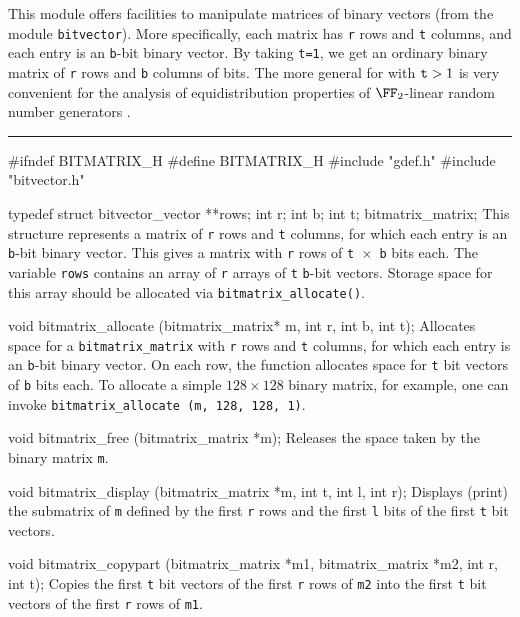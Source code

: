 
This module offers facilities to manipulate matrices of binary vectors  
(from the module \texttt{bitvector}).
More specifically, each matrix has {\tt r} rows and {\tt t} columns,
and each entry is an {\tt b}-bit binary vector.
By taking {\tt t=1}, we get an ordinary binary matrix of {\tt r} rows and 
{\tt b} columns of bits.
The more general for with ${\tt t} > 1$ is very convenient for the analysis of
equidistribution properties of $\FF_2$-linear random number generators 
\cite{rLEC05a,rLEC09a,rPAN04t}.

\bigskip\hrule

\code\hide
#ifndef BITMATRIX_H
#define BITMATRIX_H
\endhide
#include "gdef.h"
#include "bitvector.h"
\endcode

\code

typedef struct{
  bitvector_vector **rows;
  int r;
  int b;
  int t;
} bitmatrix_matrix;
\endcode
 \tab
This structure represents a matrix of {\tt r} rows and {\tt t} columns,
for which each entry is an {\tt b}-bit binary vector.
This gives a matrix with {\tt r} rows of {\tt t $\times$ b} bits each.
The variable {\tt rows} contains an array of {\tt r} arrays of {\tt t} {\tt b}-bit vectors.
Storage space for this array should be allocated via {\tt bitmatrix\_allocate()}.
\endtab
\code

void bitmatrix_allocate (bitmatrix_matrix* m, int r, int b, int t);
\endcode
\tab
Allocates space for a {\tt bitmatrix\_matrix} with {\tt r} rows and {\tt t} columns,
for which each entry is an {\tt b}-bit binary vector.
On each row, the function allocates space for {\tt t} bit vectors of {\tt b} bits each.
To allocate a simple $128 \times 128$ binary matrix, for example, one can invoke 
{\tt bitmatrix\_allocate (m, 128, 128, 1)}.  
\endtab
\code

void bitmatrix_free (bitmatrix_matrix *m);
\endcode
 \tab
 Releases the space taken by the binary matrix {\tt m}.
 \endtab
\code

void bitmatrix_display (bitmatrix_matrix *m, int t, int l, int r);
\endcode
 \tab
Displays (print) the submatrix of {\tt *m} defined by the first {\tt r} rows and the 
first {\tt l} bits of the first {\tt t} bit vectors.  
 \endtab
 \code

void bitmatrix_copypart (bitmatrix_matrix *m1, bitmatrix_matrix *m2, 
                         int r, int t);
\endcode
 \tab
Copies the first {\tt t} bit vectors of the first {\tt r} rows of 
{\tt m2} into the first {\tt t} bit vectors of the first {\tt r} rows of {\tt m1}.
 \endtab
\code

